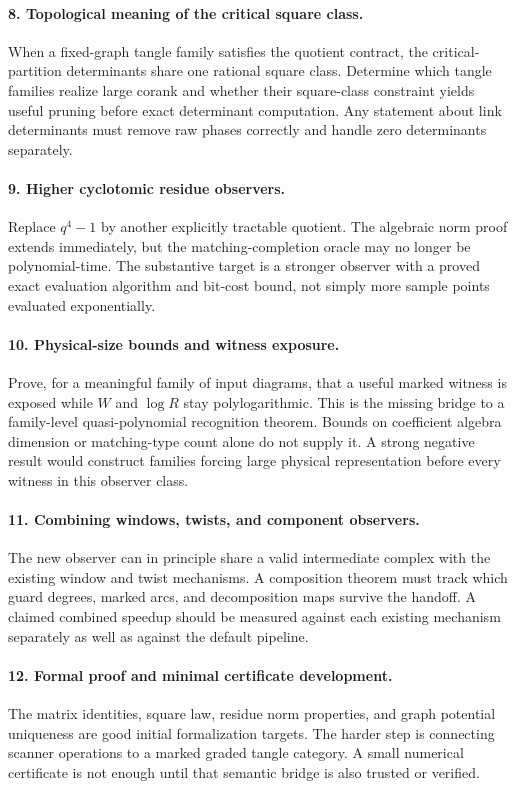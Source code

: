 \documentclass[11pt]{article}
\theoremstyle{definition}
\theoremstyle{remark}
\begin{document}
\paragraph{8. Topological meaning of the critical square class.}
When a fixed-graph tangle family satisfies the quotient contract, the
critical-partition determinants share one rational square class. Determine
which tangle families realize large corank and whether their square-class
constraint yields useful pruning before exact determinant computation.
Any statement about link determinants must remove raw phases correctly and
handle zero determinants separately.

\paragraph{9. Higher cyclotomic residue observers.}
Replace $q^4-1$ by another explicitly tractable quotient. The algebraic
norm proof extends immediately, but the matching-completion oracle may no
longer be polynomial-time. The substantive target is a stronger observer
with a proved exact evaluation algorithm and bit-cost bound, not simply
more sample points evaluated exponentially.

\paragraph{10. Physical-size bounds and witness exposure.}
Prove, for a meaningful family of input diagrams, that a useful marked
witness is exposed while $W$ and $\log R$ stay polylogarithmic. This is the
missing bridge to a family-level quasi-polynomial recognition theorem.
Bounds on coefficient algebra dimension or matching-type count alone do
not supply it. A strong negative result would construct families forcing
large physical representation before every witness in this observer class.

\paragraph{11. Combining windows, twists, and component observers.}
The new observer can in principle share a valid intermediate complex with
the existing window and twist mechanisms. A composition theorem must track
which guard degrees, marked arcs, and decomposition maps survive the
handoff. A claimed combined speedup should be measured against each existing
mechanism separately as well as against the default pipeline.

\paragraph{12. Formal proof and minimal certificate development.}
The matrix identities, square law, residue norm properties, and graph
potential uniqueness are good initial formalization targets. The harder
step is connecting scanner operations to a marked graded tangle category.
A small numerical certificate is not enough until that semantic bridge is
also trusted or verified.
\end{document}
